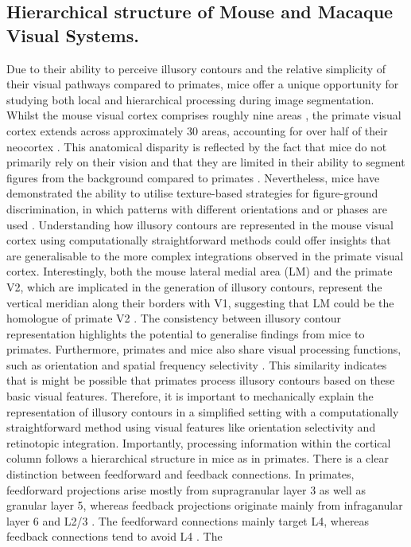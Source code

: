 \documentclass[12pt]{article}
\begin{document}

\subsection{Hierarchical structure of Mouse and Macaque Visual Systems.}
Due to their ability to perceive illusory contours and the relative simplicity of their visual pathways compared to primates, mice offer a unique opportunity for studying both local and hierarchical processing during image segmentation. Whilst the mouse visual cortex comprises roughly nine areas \autocite{wangAreaMapMouse2007}, the primate visual cortex extends across approximately 30 areas, accounting for over half of their neocortex \autocite{fellemanDistributedHierarchicalProcessing1991}. This anatomical disparity is reflected by the fact that mice do not primarily rely on their vision and that they are limited in their ability to segment figures from the background compared to primates \autocite{luongoMicePrimatesUse2023}. Nevertheless, mice have demonstrated the ability to utilise texture-based strategies for figure-ground discrimination, in which patterns with different orientations and or phases are used \autocite{kirchbergerEssentialRoleFeedback2020}. Understanding how illusory contours are represented in the mouse visual cortex using computationally straightforward methods could offer insights that are generalisable to the more complex integrations observed in the primate visual cortex. Interestingly, both the mouse lateral medial area (LM) and the primate V2, which are implicated in the generation of illusory contours, represent the vertical meridian along their borders with V1, suggesting that LM could be the homologue of primate V2 \autocite{gamanutAnatomicalFunctionalConnectomes2022}. The consistency between illusory contour representation highlights the potential to generalise findings from mice to primates. Furthermore, primates and mice also share visual processing functions, such as orientation and spatial frequency selectivity \autocite{niellHighlySelectiveReceptive2008}. This similarity indicates that is might be possible that primates process illusory contours based on these basic visual features. Therefore, it is important to mechanically explain the representation of illusory contours in a simplified setting with a computationally straightforward method using visual features like orientation selectivity and retinotopic integration. Importantly, processing information within the cortical column follows a hierarchical structure in mice as in primates. There is a clear distinction between feedforward and feedback connections. In primates, feedforward projections arise mostly from supragranular layer 3 as well as granular layer 5, whereas feedback projections originate mainly from infraganular layer 6 and L2/3 \autocite{markovAnatomyHierarchyFeedforward2014}. The feedforward connections mainly target L4, whereas feedback connections tend to avoid L4 \autocite{rocklandWhatWeKnow2019}. The 
\end{document}
